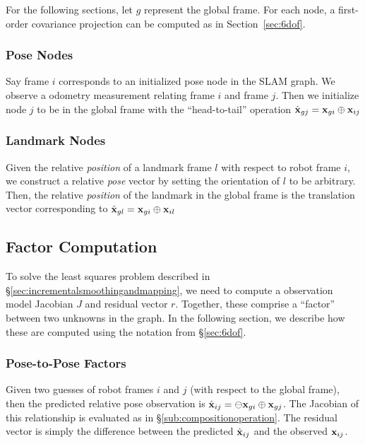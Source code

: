 \documentclass[conference]{IEEEtran}
\begin{document}
For the following sections, let $g$ represent the global frame.  For each node, a
first-order covariance projection can be computed as in Section~\ref{sec:6dof}.

\subsubsection{Pose Nodes}
\label{subs:posenodeinit}

Say frame $i$ corresponds to an initialized pose node in the SLAM graph.  We observe a
odometry measurement relating frame $i$ and frame $j$.  Then we initialize node $j$ to be
in the global frame with the ``head-to-tail'' operation $ {\hat {\bf x}_{gj}} = {\bf
  x}_{gi} \oplus {\bf x}_{ij} $

\subsubsection{Landmark Nodes}
\label{subs:pointnodeinit}
Given the relative {\it position} of a landmark frame $l$ with respect to robot frame $i$,
we construct a relative {\it pose} vector by setting the orientation of $l$ to be
arbitrary.  Then, the relative {\it position} of the landmark in the global frame is the
translation vector corresponding to $ {\hat {\bf x}}_{gl} = {\bf x}_{gi} \oplus {\bf
 x}_{il} $

\subsection{Factor Computation}
\label{sub:nodeinitializationandedgeresiduals}

To solve the least squares problem described in
\S\ref{sec:incrementalsmoothingandmapping}, we need to compute a observation model
Jacobian $J$ and residual vector $r$.  Together, these comprise a ``factor'' between two
unknowns in the graph.  In the following section, we describe how these are computed using
the notation from \S\ref{sec:6dof}.

\subsubsection{Pose-to-Pose Factors}
\label{subs:posenodelinear}
Given two guesses of robot frames $i$ and $j$ (with respect to the global frame), then the
predicted relative pose observation is $ {\hat {\bf x}_{ij}} = \ominus {\bf x}_{gi} \oplus
{\bf x}_{gj}$. The Jacobian of this relationship is evaluated as in
\S\ref{sub:compositionoperation}.  The residual vector is simply the difference
between the predicted ${\hat {\bf x}_{ij}}$ and the observed ${\bf x}_{ij}$.
\end{document}
